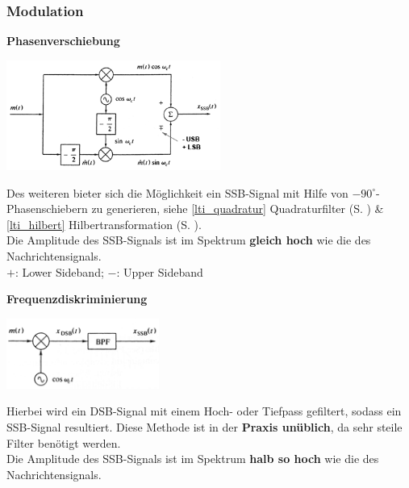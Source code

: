 \subsubsection{Modulation}
\textbf{Phasenverschiebung }  \\
\begin{minipage}[t][3.7cm][c]{7.5cm}
    \includegraphics[width=7cm]{bilder/am_ssb_modulationPhasenshifter.png}
\end{minipage}
\begin{minipage}[t][3.7cm][c]{10.5cm}	
	Des weiteren bieter sich die Möglichkeit ein SSB-Signal mit Hilfe von 
	$ - 90^{\circ} $-Phasenschiebern zu generieren, {\small siehe
	\ref{lti_quadratur} Quadraturfilter (S. \pageref{lti_quadratur}) \&
	\ref{lti_hilbert} Hilbertransformation (S. \pageref{lti_hilbert})}.\\
	Die Amplitude des SSB-Signals ist im Spektrum \textbf{gleich hoch} wie die des
	Nachrichtensignals.\\ 
	$+$: Lower Sideband; \qquad $-$: Upper Sideband
\end{minipage}

\textbf{Frequenzdiskriminierung} \\
\begin{minipage}[t][2cm][c]{5.5cm}
    \includegraphics[width=5cm]{bilder/am_ssb_modulationFilter.png}
\end{minipage}
\begin{minipage}[t][2cm][c]{12.5cm}	
	Hierbei wird ein DSB-Signal mit einem Hoch- oder Tiefpass gefiltert, sodass ein SSB-Signal
	resultiert. Diese Methode ist in der \textbf{Praxis unüblich}, da sehr steile Filter benötigt
	werden.\\
	Die Amplitude des SSB-Signals ist im Spektrum \textbf{halb so hoch} wie die des
	Nachrichtensignals.
\end{minipage}

